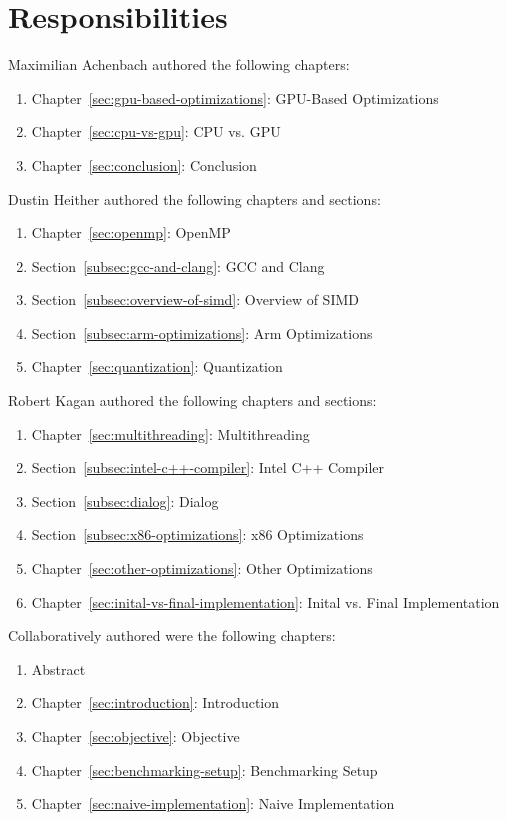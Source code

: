 \documentclass[modern,longauthor]{aastex7}
\begin{document}
\section{Responsibilities}
Maximilian Achenbach authored the following chapters:
\begin{enumerate}
    \item Chapter~\ref{sec:gpu-based-optimizations}: GPU-Based Optimizations
    \item Chapter~\ref{sec:cpu-vs-gpu}: CPU vs. GPU
    \item Chapter~\ref{sec:conclusion}: Conclusion
\end{enumerate}
Dustin Heither authored the following chapters and sections:
\begin{enumerate}
    \item Chapter~\ref{sec:openmp}: OpenMP
    \item Section~\ref{subsec:gcc-and-clang}: GCC and Clang
    \item Section~\ref{subsec:overview-of-simd}: Overview of SIMD
    \item Section~\ref{subsec:arm-optimizations}: Arm Optimizations
    \item Chapter~\ref{sec:quantization}: Quantization
\end{enumerate}
Robert Kagan authored the following chapters and sections:
\begin{enumerate}
    \item Chapter~\ref{sec:multithreading}: Multithreading
    \item Section~\ref{subsec:intel-c++-compiler}: Intel C++ Compiler
    \item Section~\ref{subsec:dialog}: Dialog
    \item Section~\ref{subsec:x86-optimizations}: x86 Optimizations
    \item Chapter~\ref{sec:other-optimizations}: Other Optimizations
    \item Chapter~\ref{sec:inital-vs-final-implementation}: Inital vs. Final Implementation
\end{enumerate}
Collaboratively authored were the following chapters:
\begin{enumerate}
    \item Abstract
    \item Chapter~\ref{sec:introduction}: Introduction 
    \item Chapter~\ref{sec:objective}: Objective
    \item Chapter~\ref{sec:benchmarking-setup}: Benchmarking Setup
    \item Chapter~\ref{sec:naive-implementation}: Naive Implementation
\end{enumerate}
\end{document}
